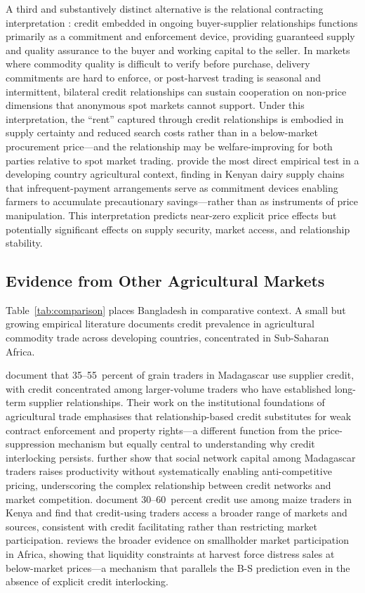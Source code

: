 \documentclass[authoryear,preprint,review,12pt]{elsarticle}
\begin{document}
A third and substantively distinct alternative is the relational contracting
interpretation \citep{casaburi_macchiavello2019, blouin_macchiavello2019}:
credit embedded in ongoing buyer-supplier relationships functions primarily
as a commitment and enforcement device, providing guaranteed supply and
quality assurance to the buyer and working capital to the seller. In markets
where commodity quality is difficult to verify before purchase, delivery
commitments are hard to enforce, or post-harvest trading is seasonal and
intermittent, bilateral credit relationships can sustain cooperation on
non-price dimensions that anonymous spot markets cannot support. Under this
interpretation, the ``rent'' captured through credit relationships is embodied
in supply certainty and reduced search costs rather than in a below-market
procurement price---and the relationship may be welfare-improving for both
parties relative to spot market trading. \citet{casaburi_macchiavello2019}
provide the most direct empirical test in a developing country agricultural
context, finding in Kenyan dairy supply chains that infrequent-payment
arrangements serve as commitment devices enabling farmers to accumulate
precautionary savings---rather than as instruments of price manipulation. This interpretation predicts
near-zero explicit price effects but potentially significant effects on
supply security, market access, and relationship stability.

\subsection{Evidence from Other Agricultural Markets}

Table~\ref{tab:comparison} places Bangladesh in comparative context.
A small but growing empirical literature documents credit prevalence in
agricultural commodity trade across developing countries, concentrated
in Sub-Saharan Africa.

\citet{fafchamps_minten1999} document that 35--55~percent of grain traders
in Madagascar use supplier credit, with credit concentrated among
larger-volume traders who have established long-term supplier relationships.
Their work on the institutional foundations of agricultural trade emphasises
that relationship-based credit substitutes for weak contract enforcement
and property rights---a different function from the price-suppression
mechanism but equally central to understanding why credit interlocking
persists. \citet{fafchamps_minten2002} further show that social network
capital among Madagascar traders raises productivity without systematically
enabling anti-competitive pricing, underscoring the complex relationship
between credit networks and market competition. \citet{stephens_barrett2011}
document 30--60~percent credit use among maize traders in Kenya and find
that credit-using traders access a broader range of markets and sources,
consistent with credit facilitating rather than restricting market
participation. \citet{barrett2008} reviews the broader evidence on
smallholder market participation in Africa, showing that liquidity
constraints at harvest force distress sales at below-market prices---a
mechanism that parallels the B-S prediction even in the absence of
explicit credit interlocking.
\end{document}
